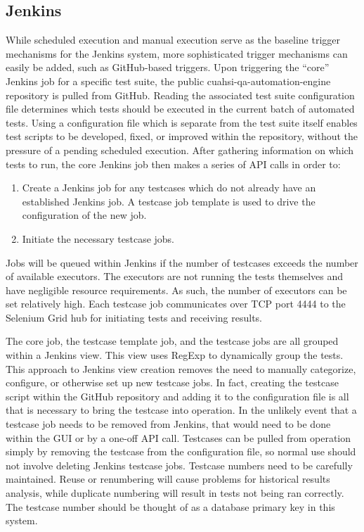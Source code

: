 \documentclass[10pt]{article}
\begin{document}
\subsection{Jenkins}
While scheduled execution and manual execution serve as the baseline trigger mechanisms for the Jenkins system, more sophisticated trigger mechanisms can easily be added, such as GitHub-based triggers.  Upon triggering the ``core'' Jenkins job for a specific test suite, the public cuahsi-qa-automation-engine repository is pulled from GitHub.  Reading the associated test suite configuration file determines which tests should be executed in the current batch of automated tests.  Using a configuration file which is separate from the test suite itself enables test scripts to be developed, fixed, or improved within the repository, without the pressure of a pending scheduled execution.  After gathering information on which tests to run, the core Jenkins job then makes a series of API calls in order to:
\begin{enumerate}
\item Create a Jenkins job for any testcases which do not already have an established Jenkins job.  A testcase job template is used to drive the configuration of the new job.
\item Initiate the necessary testcase jobs.  
\end{enumerate}
Jobs will be queued within Jenkins if the number of testcases exceeds the number of available executors.  The executors are not running the tests themselves and have negligible resource requirements.  As such, the number of executors can be set relatively high.  Each testcase job communicates over TCP port 4444 to the Selenium Grid hub for initiating tests and receiving results.

The core job, the testcase template job, and the testcase jobs are all grouped within a Jenkins view.  This view uses RegExp to dynamically group the tests.  This approach to Jenkins view creation removes the need to manually categorize, configure, or otherwise set up new testcase jobs.  In fact, creating the testcase script within the GitHub repository and adding it to the configuration file is all that is necessary to bring the testcase into operation.  In the unlikely event that a testcase job needs to be removed from Jenkins, that would need to be done within the GUI or by a one-off API call.  Testcases can be pulled from operation simply by removing the testcase from the configuration file, so normal use should not involve deleting Jenkins testcase jobs.  Testcase numbers need to be carefully maintained.  Reuse or renumbering will cause problems for historical results analysis, while duplicate numbering will result in tests not being ran correctly.  The testcase number should be thought of as a database primary key in this system.
\end{document}
